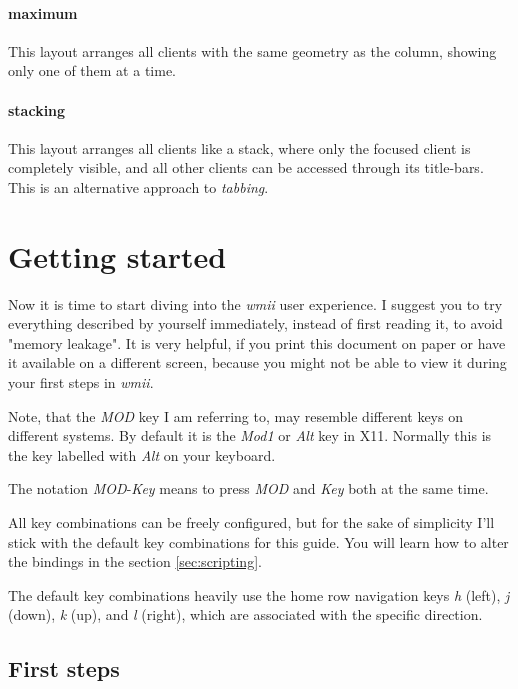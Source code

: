 \documentclass[12pt,a4paper]{article} %
\newcommand{\wmii}{\emph{wmii}}
\begin{document}
    \paragraph{maximum} This layout arranges all clients with
    the same geometry as the column, showing only one of them at a time.
    \paragraph{stacking} This layout arranges all clients
    like a stack, where only the focused client is completely
    visible, and all other clients can be accessed through its title-bars.
    This is an alternative approach to \emph{tabbing}.

    \section{Getting started}

    Now it is time to start diving into the \wmii{} user experience. I suggest you
    to try everything described by yourself immediately, instead of first reading
    it, to avoid "memory leakage".  It is very helpful, if you print this
    document on paper or have it available on a different screen, because you might not
    be able to view it during your first steps in \wmii.

    Note, that the \emph{MOD} key I am referring to, may resemble
    different keys on different systems. By default it is the 
    \emph{Mod1} or \emph{Alt} key in X11. Normally this is the key labelled with
    \emph{Alt} on your keyboard.

    The notation \emph{MOD}-\emph{Key} means to press \emph{MOD} and 
    \emph{Key} both at the same time.

    All key combinations can be freely configured, but for the sake of
    simplicity I'll stick with the default key combinations for this
    guide.  You will learn how to alter the bindings in the
    section \ref{sec:scripting}.

    The default key combinations heavily use the home row navigation keys
    \emph{h} (left), \emph{j} (down), \emph{k} (up), and \emph{l} (right),
    which are associated with the specific direction.

    \subsection{First steps}
    \label{subsec:firststeps}
\end{document}
